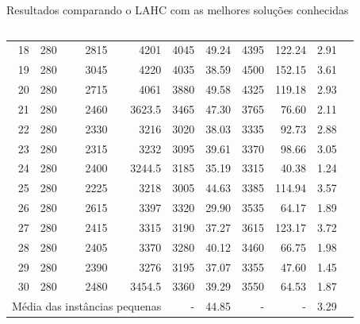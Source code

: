 \documentclass[8pt,mathserif,professionalfont]{beamer}
\begin{document}
\begin{frame}{Resultados comparando o LAHC com as melhores soluções conhecidas}
\begin{columns}
\begin{column}{0.5\textwidth}
\begin{table}[!]
{\begin{tabular}{rlrrrrrrrr}
18	&	280	&	2815	&	4201	&	4045	&	49.24	&	4395	&	122.24	&	2.91	\\
19	&	280	&	3045	&	4220	&	4035	&	38.59	&	4500	&	152.15	&	3.61	\\
20	&	280	&	2715	&	4061	&	3880	&	49.58	&	4325	&	119.18	&	2.93	\\
21		&	280	&	2460	&	3623.5	&	3465	&	47.30	&	3765	&	76.60	&	2.11	\\
22		&	280	&	2330	&	3216	&	3020	&	38.03	&	3335	&	92.73	&	2.88	\\
23		&	280	&	2315	&	3232	&	3095	&	39.61	&	3370	&	98.66	&	3.05	\\
24		&	280	&	2400	&	3244.5	&	3185	&	35.19	&	3315	&	40.38	&	1.24	\\
25		&	280	&	2225	&	3218	&	3005	&	44.63	&	3385	&	114.94	&	3.57	\\
26		&	280	&	2615	&	3397	&	3320	&	29.90	&	3535	&	64.17	&	1.89	\\
27		&	280	&	2415	&	3315	&	3190	&	37.27	&	3615	&	123.17	&	3.72	\\
28		&	280	&	2405	&	3370	&	3280	&	40.12	&	3460	&	66.75	&	1.98	\\
29		&	280	&	2390	&	3276	&	3195	&	37.07	&	3355	&	47.60	&	1.45	\\
30		&	280	&	2480	&	3454.5	&	3360	&	39.29	&	3550	&	64.53	&	1.87	\\
  \midrule		
  \multicolumn{4}{l}{Média das instâncias pequenas}   -       &   -       &	44.85   &   -       &   -       &   3.29  \\		
   \bottomrule
\end{tabular}
}
\end{table}


\end{column}
\end{columns}
\end{frame}
\end{document}
